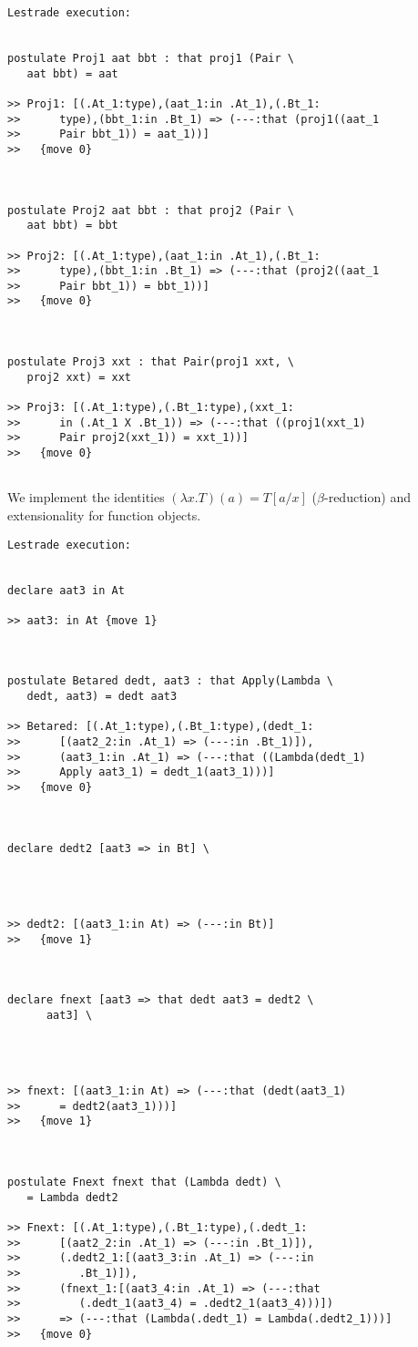 \documentclass[12pt]{article}
\begin{document}
\begin{verbatim}Lestrade execution:


postulate Proj1 aat bbt : that proj1 (Pair \
   aat bbt) = aat

>> Proj1: [(.At_1:type),(aat_1:in .At_1),(.Bt_1:
>>      type),(bbt_1:in .Bt_1) => (---:that (proj1((aat_1
>>      Pair bbt_1)) = aat_1))]
>>   {move 0}



postulate Proj2 aat bbt : that proj2 (Pair \
   aat bbt) = bbt

>> Proj2: [(.At_1:type),(aat_1:in .At_1),(.Bt_1:
>>      type),(bbt_1:in .Bt_1) => (---:that (proj2((aat_1
>>      Pair bbt_1)) = bbt_1))]
>>   {move 0}



postulate Proj3 xxt : that Pair(proj1 xxt, \
   proj2 xxt) = xxt

>> Proj3: [(.At_1:type),(.Bt_1:type),(xxt_1:
>>      in (.At_1 X .Bt_1)) => (---:that ((proj1(xxt_1)
>>      Pair proj2(xxt_1)) = xxt_1))]
>>   {move 0}


\end{verbatim}

We implement the identities $(\lambda x.T)(a) = T[a/x]$ ($\beta$-reduction) and extensionality for function objects.

\begin{verbatim}Lestrade execution:


declare aat3 in At

>> aat3: in At {move 1}



postulate Betared dedt, aat3 : that Apply(Lambda \
   dedt, aat3) = dedt aat3

>> Betared: [(.At_1:type),(.Bt_1:type),(dedt_1:
>>      [(aat2_2:in .At_1) => (---:in .Bt_1)]),
>>      (aat3_1:in .At_1) => (---:that ((Lambda(dedt_1)
>>      Apply aat3_1) = dedt_1(aat3_1)))]
>>   {move 0}



declare dedt2 [aat3 => in Bt] \
   



>> dedt2: [(aat3_1:in At) => (---:in Bt)]
>>   {move 1}



declare fnext [aat3 => that dedt aat3 = dedt2 \
      aat3] \
   



>> fnext: [(aat3_1:in At) => (---:that (dedt(aat3_1)
>>      = dedt2(aat3_1)))]
>>   {move 1}



postulate Fnext fnext that (Lambda dedt) \
   = Lambda dedt2

>> Fnext: [(.At_1:type),(.Bt_1:type),(.dedt_1:
>>      [(aat2_2:in .At_1) => (---:in .Bt_1)]),
>>      (.dedt2_1:[(aat3_3:in .At_1) => (---:in
>>         .Bt_1)]),
>>      (fnext_1:[(aat3_4:in .At_1) => (---:that
>>         (.dedt_1(aat3_4) = .dedt2_1(aat3_4)))])
>>      => (---:that (Lambda(.dedt_1) = Lambda(.dedt2_1)))]
>>   {move 0}


\end{verbatim}
\end{document}
